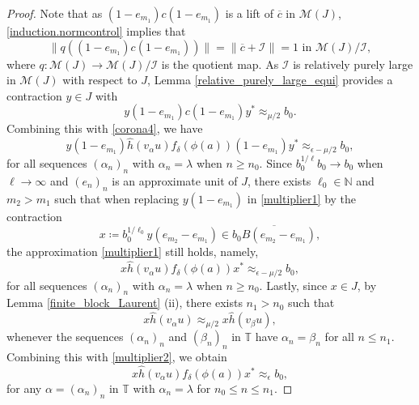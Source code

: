 \documentclass[reqno]{amsart}
\theoremstyle{definition}
\theoremstyle{remark}
\numberwithin{equation}{section}
\theoremstyle{definition}
\newcommand{\calM}{\mathcal{M}}
\newcommand{\calI}{\mathcal{I}}
\begin{document}
\begin{proof}
Note that as $(1-e_{m_1})c(1-e_{m_1})$ is a lift of $\overline{c}$ in $\calM(J)$, \eqref{induction.normcontrol} implies that
\begin{equation}
\|q((1-e_{m_1})c(1-e_{m_1}))\| = \|\overline{c} + \calI \|=1\text{ in }\mathcal M(J)/\mathcal I, 
\end{equation} 
where $q: \calM(J) \rightarrow \calM(J)/\mathcal I$ is the quotient map. As $\mathcal I$ is relatively purely large in $\calM(J)$ with respect to $J$, Lemma \ref{relative_purely_large_equi} provides a contraction $y\in J$ with 
\begin{equation} 
y(1-e_{m_1})c(1-e_{m_1})y^*\approx_{\mu/2} b_0.
\end{equation} 
Combining this with \eqref{corona4}, we have
\begin{equation} \label{multiplier1} 
    y(1-e_{m_{1}}) \hat{h}( v_{\alpha} u) f_{\delta}(\phi(a)) (1-e_{m_{1}})y^*\approx_{\epsilon-\mu/2} b_0,
\end{equation}
for all sequences $(\alpha_n)_{n}$ with $\alpha_n=\lambda$ when $n\geq n_{0}$. Since $b_{0}^{1/\ell} b_{0} \rightarrow b_{0}$ when $\ell \rightarrow \infty$ and $(e_{n})_{n}$ is an approximate unit of $J$, there exists $\ell_{0}\in \mathbb{N}$ and $m_{2}>m_{1}$ such that when replacing $y(1-e_{m_{1}})$ in \eqref{multiplier1} by the contraction 
\begin{equation} 
x \coloneqq b_{0}^{1/\ell_{0}} y (e_{m_{2}}-e_{m_{1}})\in \overline{b_{0}B(e_{m_{2}}-e_{m_{1}})}, 
\end{equation} 
the approximation \eqref{multiplier1} still holds, namely, 
\begin{equation}  \label{multiplier2} 
x \hat{h}(v_{\alpha} u) f_{\delta}(\phi(a)) x^{\ast} \approx_{\epsilon - \mu /2} b_{0}, 
\end{equation} 
for all sequences $(\alpha_n)_{n}$ with $\alpha_n=\lambda$ when $n\geq n_{0}$. Lastly, since $x\in J$, by Lemma \ref{finite_block_Laurent} (ii), there exists $n_{1}>n_{0}$ such that 
\begin{equation}
x\hat{h}(v_\alpha u)\approx_{\mu/2} x\hat{h}(v_\beta u), 
\end{equation} 
whenever the sequences $(\alpha_n)_n$ and $(\beta_n)_n$ in $\mathbb T$ have $\alpha_n=\beta_n$ for all $n\leq n_{1}$. 
Combining this with \eqref{multiplier2}, we obtain 
\begin{equation}
    x \hat{h}(v_{\alpha} u) f_{\delta} (\phi(a)) x^*\approx_{\epsilon} b_0, 
\end{equation} 
for any $\alpha = (\alpha_{n})_{n}$ in $\mathbb{T}$ with $\alpha_{n} = \lambda$ for $n_{0}\leq n\leq n_{1}$. 
\end{proof} 
\end{document}
